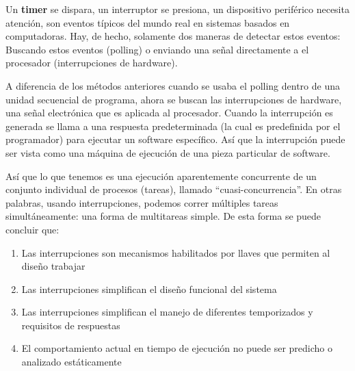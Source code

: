 \documentclass[12pt, twoside]{report}
\begin{document}
Un \textbf{timer} se dispara, un interruptor se presiona, un dispositivo periférico necesita atención, son eventos típicos del mundo real en sistemas basados en computadoras. Hay, de hecho, solamente dos maneras de detectar estos eventos: Buscando estos eventos (polling) o enviando una señal directamente a el procesador (interrupciones de hardware).

A diferencia de los métodos anteriores cuando se usaba el polling dentro de una unidad secuencial de programa, ahora se buscan las interrupciones de hardware, una señal electrónica que es aplicada al procesador. Cuando la interrupción es generada se llama a una respuesta predeterminada (la cual es predefinida por el programador)  para ejecutar un software específico. Así que la interrupción puede ser vista como una máquina de ejecución de una pieza particular de software.

Así que lo que tenemos es una ejecución aparentemente concurrente de un conjunto individual de procesos (tareas), llamado ``cuasi-concurrencia''. En otras palabras, usando interrupciones, podemos correr múltiples tareas simultáneamente: una forma de multitareas simple. De esta forma se puede concluir que:

\begin{enumerate}
	\item Las interrupciones son mecanismos habilitados por llaves que permiten al diseño trabajar
	\item Las interrupciones simplifican el diseño funcional del sistema
	\item Las interrupciones simplifican el manejo de diferentes temporizados y requisitos de respuestas
	\item El comportamiento actual en tiempo de ejecución no puede ser predicho o analizado estáticamente
\end{enumerate}



\end{document}

